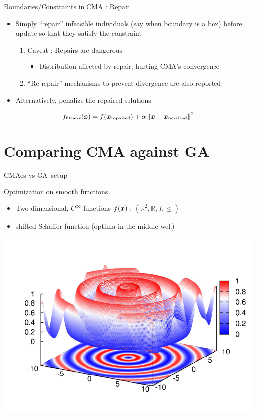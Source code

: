 \documentclass[presentation]{beamer}
\newcommand{\gv}[1]{\ensuremath{\mbox{\boldmath$ #1 $}}}
\newcommand{\norm}[1]{\left\lVert#1\right\rVert}
\begin{document}
\begin{frame}[label={sec:orgd4a8162}]{Boundaries/Constraints in CMA : Repair}
\begin{itemize}
\item Simply ``repair'' infeasible individuals (say when boundary is a box) before
update so that they satisfy the constraint
\begin{enumerate}
\item Caveat : Repairs are dangerous
\begin{itemize}
\item Distribution affected by repair, hurting CMA's convergence
\end{itemize}
\item ``Re-repair'' mechanisms to prevent divergence are also reported
\end{enumerate}

\item Alternatively, penalize the repaired solutions
\end{itemize}
\[  f_{\text{fitness}} (\gv{x}) = f(\gv{x}_{\text{repaired}}) + \alpha \norm{\gv{x} -
\gv{x}_{\text{repaired}}}^2 \]
\end{frame}

\section{Comparing CMA against GA}
\label{sec:orgfd2926f}
\begin{frame}[label={sec:orgcc5d87a}]{CMAes vs GA--setup}
\begin{block}{Optimization on smooth functions}
\begin{itemize}
\item Two dimensional, \(C^{\infty}\) functions \(f(\gv{x})\) : \(\left(\mathbb{R}^2,  \mathbb{R}, f, \leq \right)\)
\item shifted Schaffer function (optima in the middle well)
\end{itemize}
\end{block}
\begin{center}
\includegraphics[width=.9\linewidth]{images/schaffer.png}
\end{center}
\end{frame}
\end{document}
